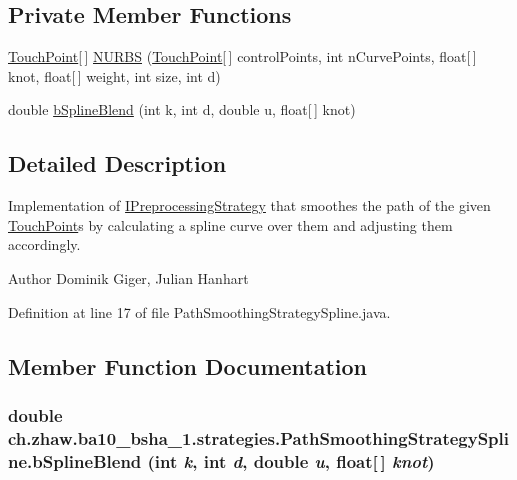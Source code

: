 \subsection*{Private Member Functions}
\begin{DoxyCompactItemize}
\item 
\hyperlink{classch_1_1zhaw_1_1ba10__bsha__1_1_1TouchPoint}{TouchPoint}\mbox{[}$\,$\mbox{]} \hyperlink{classch_1_1zhaw_1_1ba10__bsha__1_1_1strategies_1_1PathSmoothingStrategySpline_af58eb333b4b6ee0e1808b1bd68cbca69}{NURBS} (\hyperlink{classch_1_1zhaw_1_1ba10__bsha__1_1_1TouchPoint}{TouchPoint}\mbox{[}$\,$\mbox{]} controlPoints, int nCurvePoints, float\mbox{[}$\,$\mbox{]} knot, float\mbox{[}$\,$\mbox{]} weight, int size, int d)
\item 
double \hyperlink{classch_1_1zhaw_1_1ba10__bsha__1_1_1strategies_1_1PathSmoothingStrategySpline_ae3bc9fc75c874c6012436d5dfb5ec585}{bSplineBlend} (int k, int d, double u, float\mbox{[}$\,$\mbox{]} knot)
\end{DoxyCompactItemize}


\subsection{Detailed Description}
Implementation of \hyperlink{interfacech_1_1zhaw_1_1ba10__bsha__1_1_1strategies_1_1IPreprocessingStrategy}{IPreprocessingStrategy} that smoothes the path of the given \hyperlink{classch_1_1zhaw_1_1ba10__bsha__1_1_1TouchPoint}{TouchPoint}s by calculating a spline curve over them and adjusting them accordingly.

\begin{DoxyAuthor}{Author}
Dominik Giger, Julian Hanhart 
\end{DoxyAuthor}


Definition at line 17 of file PathSmoothingStrategySpline.java.

\subsection{Member Function Documentation}
\hypertarget{classch_1_1zhaw_1_1ba10__bsha__1_1_1strategies_1_1PathSmoothingStrategySpline_ae3bc9fc75c874c6012436d5dfb5ec585}{
\subsubsection[{bSplineBlend}]{\setlength{\rightskip}{0pt plus 5cm}double ch.zhaw.ba10\_\-bsha\_\-1.strategies.PathSmoothingStrategySpline.bSplineBlend (int {\em k}, \/  int {\em d}, \/  double {\em u}, \/  float\mbox{[}$\,$\mbox{]} {\em knot})}}
\label{classch_1_1zhaw_1_1ba10__bsha__1_1_1strategies_1_1PathSmoothingStrategySpline_ae3bc9fc75c874c6012436d5dfb5ec585}


